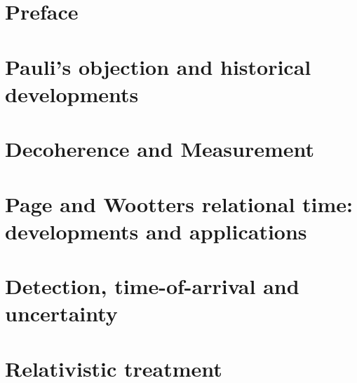 




\frontmatter

\maketitle

\tableofcontents

\listoffigures

\listoftables

\chapter*{Preface}


\mainmatter

\chapter{Pauli's objection and historical developments}


\chapter{Decoherence and Measurement}









\chapter{Page and Wootters relational time: developments and applications}
  \label{ch:pw}



\chapter{Detection, time-of-arrival and uncertainty}



\chapter{Relativistic treatment}


